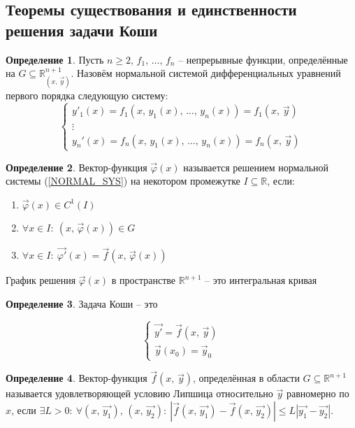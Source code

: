 \documentclass[a4paper,12pt]{article}
\renewcommand{\phi}{\ensuremath{\varphi}}
\renewcommand{\leq}{\ensuremath{\leqslant}}
\renewcommand{\geq}{\ensuremath{\geqslant}}
\theoremstyle{plain}
\theoremstyle{definition}
\newtheorem{definition}{Определение}[section]
\theoremstyle{remark}
\begin{document}
\subsection{Теоремы существования и единственности решения задачи Коши}
\begin{definition}
	Пусть $n \geq 2,\, f_1,\, \ldots,\, f_n$ -- непрерывные функции, определённые на $G \subseteq \mathbb{R}^{n + 1}_{(x,\, \vec{y})}$. Назовём нормальной системой дифференциальных уравнений первого порядка следующую систему:
	\begin{equation}
		\label{NORMAL_SYS}
		\begin{cases}
			y'_1(x) = f_1(x,\,y_1(x),\,\ldots,\,y_n(x)) = f_1(x,\,\vec{y}) \\
			\vdots                                                         \\
			y_n'(x) = f_n(x,\,y_1(x),\,\ldots,\,y_n(x)) = f_n(x,\,\vec{y})
		\end{cases}
	\end{equation}

\end{definition}

\begin{definition}
	Вектор-функция $\vec{\phi}(x)$ называется решением нормальной системы (\ref*{NORMAL_SYS}) на некотором промежутке $I \subseteq \mathbb{R}$, если:
	\begin{enumerate}
		\item $\vec{\phi}(x) \in C^1(I)$
		\item $\forall x \in I:\: (x,\,\vec{\phi}(x)) \in G$
		\item $\forall x \in I:\: \vec{\phi'}(x) = \vec{f}(x,\, \vec{\phi}(x))$
	\end{enumerate}

	График решения $\vec{\phi}(x)$ в пространстве $\mathbb{R}^{n + 1}$ -- это интегральная кривая
\end{definition}

\begin{definition}
	Задача Коши -- это

	\[\begin{cases}
			\vec{y'} = \vec{f}(x,\, \vec{y}) \\
			\vec{y}(x_0) = \vec{y}_0
		\end{cases}\]
\end{definition}

\begin{definition}
	Вектор-функция $\vec{f}(x,\,\vec{y})$, определённая в области $G \subseteq \mathbb{R}^{n + 1}$ называется удовлетворяющей условию Липшица относительно $\vec{y}$ равномерно по $x$, если $\exists L > 0:\: \forall (x,\, \vec{y_1}),\, (x,\,\vec{y_2}):\: |\vec{f}(x,\,\vec{y_1}) - \vec{f}(x,\,\vec{y_2})| \leq L|\vec{y_1} - \vec{y_2}|$.
\end{definition}
\end{document}

